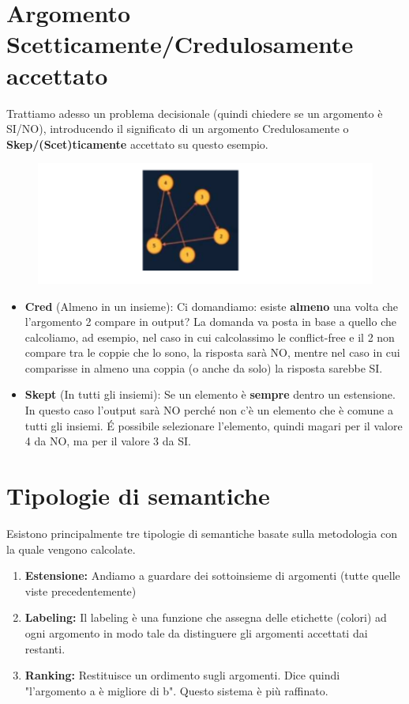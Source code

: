     \section{Argomento Scetticamente/Credulosamente accettato}
    Trattiamo adesso un problema decisionale (quindi chiedere se un argomento è SI/NO), introducendo il significato di un argomento Credulosamente o \textbf{Skep/(Scet)ticamente }accettato su questo esempio.
    \begin{figure}[H]
        \centering
        \includegraphics[width=12cm, keepaspectratio]{img/Cap6/scet.png}
    \end{figure}
    \begin{itemize}
        \item \textbf{Cred} (Almeno in un insieme): Ci domandiamo: esiste \textbf{almeno} una volta che l'argomento 2 compare in output? La domanda va posta in base a quello che calcoliamo, ad esempio, nel caso in cui calcolassimo le conflict-free e il 2 non compare tra le coppie che lo sono, la risposta sarà NO, mentre nel caso in cui comparisse in almeno una coppia (o anche da solo) la risposta sarebbe SI.
        \item \textbf{Skept} (In tutti gli insiemi): Se un elemento è \textbf{sempre} dentro un estensione. In questo caso l'output sarà NO perché non c'è un elemento che è comune a tutti gli insiemi. É possibile selezionare l'elemento, quindi magari per il valore 4 da NO, ma per il valore 3 da SI.
    \end{itemize}

    \section{Tipologie di semantiche}
    Esistono principalmente tre tipologie di semantiche basate sulla metodologia
    con la quale vengono calcolate.
    \begin{enumerate}
        \item \textbf{Estensione:} Andiamo a guardare dei sottoinsieme di argomenti (tutte quelle viste precedentemente)
        \item \textbf{Labeling:} Il labeling è una funzione che assegna delle etichette (colori) ad ogni argomento in modo tale da distinguere gli argomenti accettati dai restanti.
        \item \textbf{Ranking:} Restituisce un ordimento sugli argomenti. Dice quindi "l'argomento a è migliore di b". Questo sistema è più raffinato.
    \end{enumerate}

